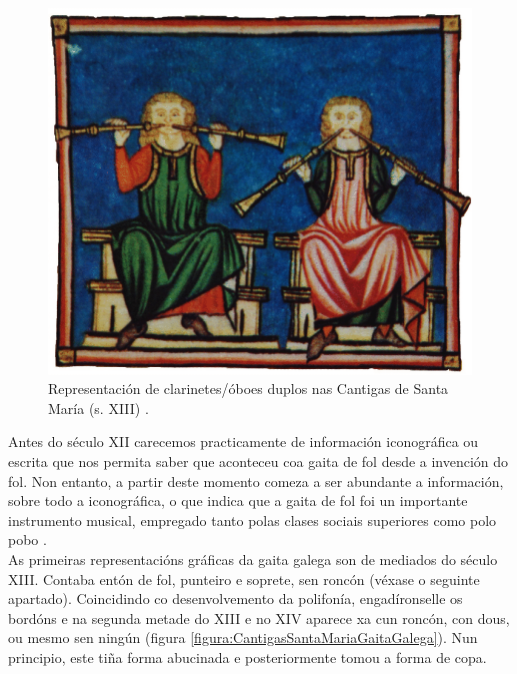  \begin{figure}[htbp]
  \centering
  \includegraphics[scale=0.2,keepaspectratio=true]{./imagenes/cantigas-santa-maria-clarinetes-oboes-duplos.png}
  \caption[Clarinetes/óboes duplos nas Cantigas de Santa María]{Representación de clarinetes/óboes duplos nas Cantigas de Santa María (s. XIII) \cite{CantigasSantaMariaClarinetesOboesDuplos}.}
  \label{figura:CantigasSantaMariaClarinetesOboesDuplos}
 \end{figure}

 Antes do século XII carecemos practicamente de información iconográfica ou
 escrita que nos permita saber que aconteceu coa gaita de fol desde a invención
 do fol. Non entanto, a partir deste momento comeza a ser abundante a
 información, sobre todo a iconográfica, o que indica que a gaita de fol foi un
 importante instrumento musical, empregado tanto polas clases sociais
 superiores como polo pobo \cite{AGGGaitaGalega}. \\

 As primeiras representacións gráficas da gaita galega son de mediados do
 século XIII. Contaba entón de fol, punteiro e soprete, sen roncón (véxase o
 seguinte apartado). Coincidindo co desenvolvemento da polifonía,
 engadíronselle os bordóns e na segunda metade do XIII e no XIV aparece xa cun
 roncón, con dous, ou mesmo sen ningún (figura
 \ref{figura:CantigasSantaMariaGaitaGalega}). Nun principio, este tiña forma
 abucinada e posteriormente tomou a forma de copa.


